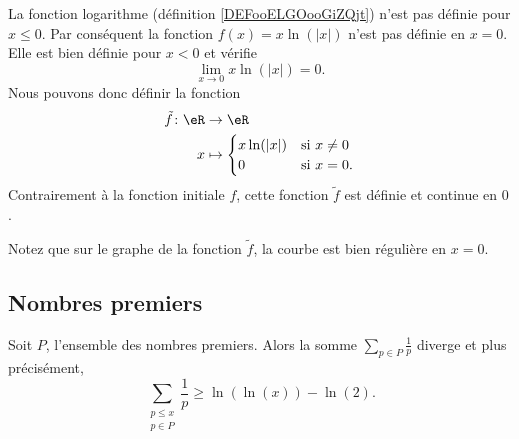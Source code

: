 \begin{example}     \label{EXooAGEOooQdQkrS}
    La fonction logarithme (définition \ref{DEFooELGOooGiZQjt}) n'est pas définie pour \( x\leq 0\). Par conséquent la fonction \( f(x)=x\ln(|x|)\) n'est pas définie en \( x=0\). Elle est bien définie pour \( x<0\) et vérifie
    \begin{equation}
        \lim_{x\to 0} x\ln(|x|)=0.
    \end{equation}
    Nous pouvons donc définir la fonction
    \begin{equation}
        \begin{aligned}
            \tilde f\colon \eR&\to \eR \\
            x&\mapsto \begin{cases}
                x\ln(| x |)    &   \text{si } x\neq 0\\
                0    &    \text{si } x=0.
            \end{cases}
        \end{aligned}
    \end{equation}
    Contrairement à la fonction initiale \( f\), cette fonction \( \tilde f\) est définie et continue en \( 0\). 

    Notez que sur le graphe de la fonction \( \tilde f\), la courbe est bien régulière en \( x=0\).
    \begin{center}
       
    \end{center}
\end{example}

\subsection{Nombres premiers}

\begin{theorem} \label{ThonfVruT}
    Soit \( P\), l'ensemble des nombres premiers. Alors la somme \( \sum_{p\in P}\frac{1}{ p }\) diverge et plus précisément,
    \begin{equation}
        \sum_{\substack{p\leq x\\p\in P}}\frac{1}{ p }\geq \ln(\ln(x))-\ln(2).
    \end{equation}
\end{theorem}

